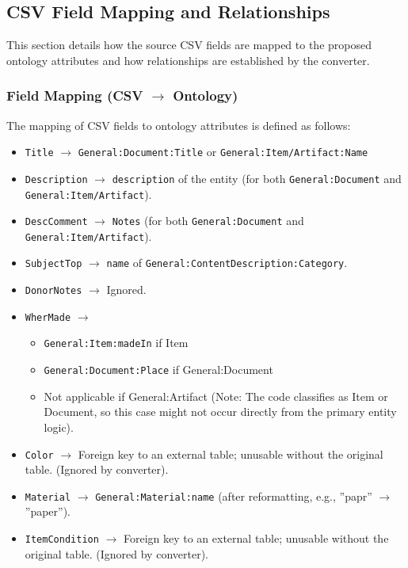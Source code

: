 \subsection{CSV Field Mapping and Relationships}
\label{sec:mapping}
This section details how the source CSV fields are mapped to the proposed ontology attributes and how relationships are established by the converter.

\subsubsection{Field Mapping (CSV $\rightarrow$ Ontology)}
The mapping of CSV fields to ontology attributes is defined as follows:

\begin{itemize}
    \item \texttt{Title} $\rightarrow$ \texttt{General:Document:Title} or \texttt{General:Item/Artifact:Name}
    \item \texttt{Description} $\rightarrow$ \texttt{description} of the entity (for both \texttt{General:Document} and \texttt{General:Item/Artifact}).
    \item \texttt{DescComment} $\rightarrow$ \texttt{Notes} (for both \texttt{General:Document} and \texttt{General:Item/Artifact}).
    \item \texttt{SubjectTop} $\rightarrow$ \texttt{name} of \texttt{General:ContentDescription:Category}.
    \item \texttt{DonorNotes} $\rightarrow$ Ignored.
    \item \texttt{WherMade} $\rightarrow$
        \begin{itemize}
            \item \texttt{General:Item:madeIn} if Item
            \item \texttt{General:Document:Place} if General:Document
            \item Not applicable if General:Artifact (Note: The code classifies as Item or Document, so this case might not occur directly from the primary entity logic).
        \end{itemize}
    \item \texttt{Color} $\rightarrow$ Foreign key to an external table; unusable without the original table. (Ignored by converter).
    \item \texttt{Material} $\rightarrow$ \texttt{General:Material:name} (after reformatting, e.g., ”papr” $\rightarrow$ ”paper”).
    \item \texttt{ItemCondition} $\rightarrow$ Foreign key to an external table; unusable without the original table. (Ignored by converter).

\end{itemize}
